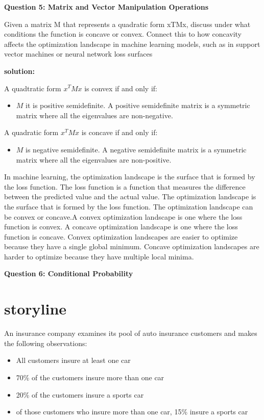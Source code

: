 \documentclass{article}
\begin{document}
\begin{center}
    \large \textbf{Question 5: Matrix and Vector Manipulation Operations}
\end{center}

Given a matrix M that represents a quadratic form xTMx, discuss under what conditions the function is
concave or convex. Connect this to how concavity affects the optimization landscape in machine learning
models, such as in support vector machines or neural network loss surfaces

\textbf{solution:}

A quadtratic form \(x^T M  x\) is convex if and only if:\newline

\begin{itemize}
    \item \(M\) it is positive semidefinite. A positive semidefinite matrix is a symmetric matrix where all the eigenvalues are non-negative.\newline
\end{itemize}

A quadratic form \(x^T M  x\) is concave if and only if:\newline
\begin{itemize}
    \item \(M\) is negative semidefinite. A negative semidefinite matrix is a symmetric matrix where all the eigenvalues are non-positive.\newline
\end{itemize}

In machine learning, the optimization landscape is the surface that is formed by the loss function. The loss function is a function that measures the difference between the predicted value and the actual value. The optimization landscape is the surface that is formed by the loss function. The optimization landscape can be convex or concave.\newline A convex optimization landscape is one where the loss function is convex. A concave optimization landscape is one where the loss function is concave. Convex optimization landscapes are easier to optimize because they have a single global minimum. Concave optimization landscapes are harder to optimize because they have multiple local minima. 


\begin{center}
    \large \textbf{Question 6: Conditional Probability}
\end{center}
\section{storyline}
An insurance company examines its pool of auto insurance customers and makes the following observations:
\begin{itemize}
    \item All customers insure at least one car
    \item 70\% of the customers insure more than one car
    \item 20\% of the customers insure a sports car
    \item of those customers who insure more than one car, 15\% insure a sports car
\end{itemize}
\end{document}
